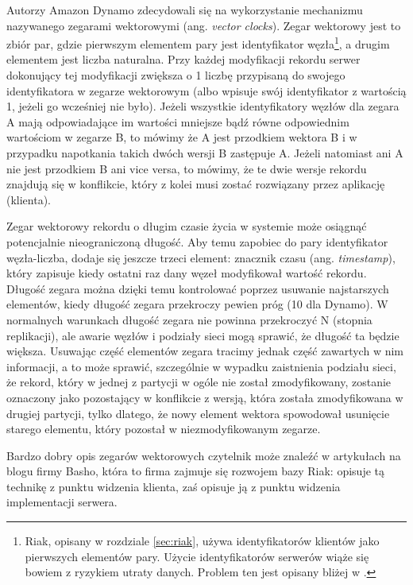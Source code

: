 Autorzy Amazon Dynamo zdecydowali się na wykorzystanie mechanizmu nazywanego zegarami wektorowymi (ang. \emph{vector clocks}).
Zegar wektorowy jest to zbiór par, gdzie pierwszym elementem pary jest identyfikator węzła\footnote{Riak, opisany w rozdziale \ref{sec:riak}, używa identyfikatorów klientów jako pierwszych elementów pary. Użycie identyfikatorów serwerów wiąże się bowiem z ryzykiem utraty danych. Problem ten jest opisany bliżej w \cite{basho-vector-clocks-hard}.}, a drugim elementem jest liczba naturalna.
Przy każdej modyfikacji rekordu serwer dokonujący tej modyfikacji zwiększa o 1 liczbę przypisaną do swojego identyfikatora w zegarze wektorowym (albo wpisuje swój identyfikator z wartością 1, jeżeli go wcześniej nie było).
Jeżeli wszystkie identyfikatory węzłów dla zegara A mają odpowiadające im wartości mniejsze bądź równe odpowiednim wartościom w zegarze B, to mówimy że A jest przodkiem wektora B i w przypadku napotkania takich dwóch wersji B zastępuje A.
Jeżeli natomiast ani A nie jest przodkiem B ani vice versa, to mówimy, że te dwie wersje rekordu znajdują się w konflikcie, który z kolei musi zostać rozwiązany przez aplikację (klienta).

Zegar wektorowy rekordu o długim czasie życia w systemie może osiągnąć potencjalnie nieograniczoną długość.
Aby temu zapobiec do pary identyfikator węzła-liczba, dodaje się jeszcze trzeci element: znacznik czasu (ang. \emph{timestamp}), który zapisuje kiedy ostatni raz dany węzeł modyfikował wartość rekordu.
Długość zegara można dzięki temu kontrolować poprzez usuwanie najstarszych elementów, kiedy długość zegara przekroczy pewien próg (10 dla Dynamo).
W normalnych warunkach długość zegara nie powinna przekroczyć N (stopnia replikacji), ale awarie węzłów i podziały sieci mogą sprawić, że długość ta będzie większa.
Usuwając część elementów zegara tracimy jednak część zawartych w nim informacji, a to może sprawić, szczególnie w wypadku zaistnienia podziału sieci, że rekord, który w jednej z partycji w ogóle nie został zmodyfikowany, zostanie oznaczony jako pozostający w konflikcie z wersją, która została zmodyfikowana w drugiej partycji, tylko dlatego, że nowy element wektora spowodował usunięcie starego elementu, który pozostał w niezmodyfikowanym zegarze.

Bardzo dobry opis zegarów wektorowych czytelnik może znaleźć w artykułach na blogu firmy Basho, która to firma zajmuje się rozwojem bazy Riak: \cite{basho-vector-clocks-easy} opisuje tą technikę z punktu widzenia klienta, zaś \cite{basho-vector-clocks-hard} opisuje ją z punktu widzenia implementacji serwera.

